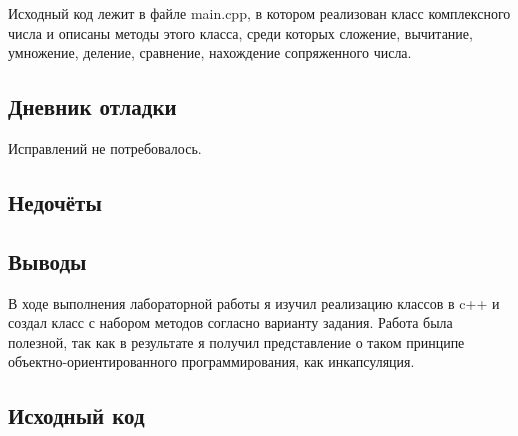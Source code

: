 \documentclass[12pt]{article}
\begin{document}
Исходный код лежит в файле main.cpp, в котором реализован класс комплексного числа и описаны методы этого класса, среди которых сложение, вычитание, умножение, деление, сравнение, нахождение сопряженного числа.

\subsection*{Дневник отладки}
Исправлений не потребовалось.


\subsection*{Недочёты}


\subsection*{Выводы}
В ходе выполнения лабораторной работы я изучил реализацию классов в c++ и создал класс с набором методов согласно варианту задания. Работа была полезной, так как в результате я  получил представление о таком принципе объектно-ориентированного программирования, как инкапсуляция.


\vfill

\subsection*{Исходный код}
\end{document}
